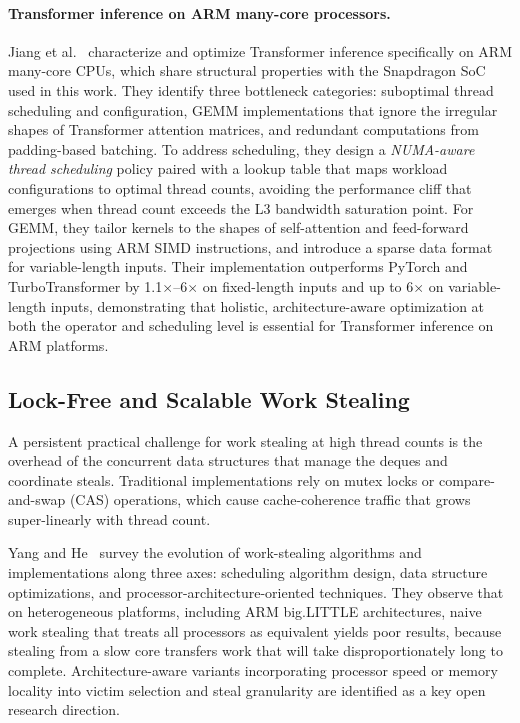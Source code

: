 \documentclass[11pt,english]{article}
\begin{document}
    \paragraph{Transformer inference on ARM many-core processors.}
    Jiang et al.~\cite{jiang2022arm} characterize and optimize Transformer inference specifically on ARM many-core CPUs, which share structural properties with the Snapdragon SoC used in this work. They identify three bottleneck categories: suboptimal thread scheduling and configuration, GEMM implementations that ignore the irregular shapes of Transformer attention matrices, and redundant computations from padding-based batching. To address scheduling, they design a \emph{NUMA-aware thread scheduling} policy paired with a lookup table that maps workload configurations to optimal thread counts, avoiding the performance cliff that emerges when thread count exceeds the L3 bandwidth saturation point. For GEMM, they tailor kernels to the shapes of self-attention and feed-forward projections using ARM SIMD instructions, and introduce a sparse data format for variable-length inputs. Their implementation outperforms PyTorch and TurboTransformer by 1.1$\times$--6$\times$ on fixed-length inputs and up to 6$\times$ on variable-length inputs, demonstrating that holistic, architecture-aware optimization at both the operator and scheduling level is essential for Transformer inference on ARM platforms.
 
    \subsection{Lock-Free and Scalable Work Stealing}
 
    A persistent practical challenge for work stealing at high thread counts is the overhead of the concurrent data structures that manage the deques and coordinate steals. Traditional implementations rely on mutex locks or compare-and-swap (CAS) operations, which cause cache-coherence traffic that grows super-linearly with thread count.
 
    Yang and He~\cite{yanghe2018survey} survey the evolution of work-stealing algorithms and implementations along three axes: scheduling algorithm design, data structure optimizations, and processor-architecture-oriented techniques. They observe that on heterogeneous platforms, including ARM big.LITTLE architectures, naive work stealing that treats all processors as equivalent yields poor results, because stealing from a slow core transfers work that will take disproportionately long to complete. Architecture-aware variants incorporating processor speed or memory locality into victim selection and steal granularity are identified as a key open research direction.
 
\end{document}
